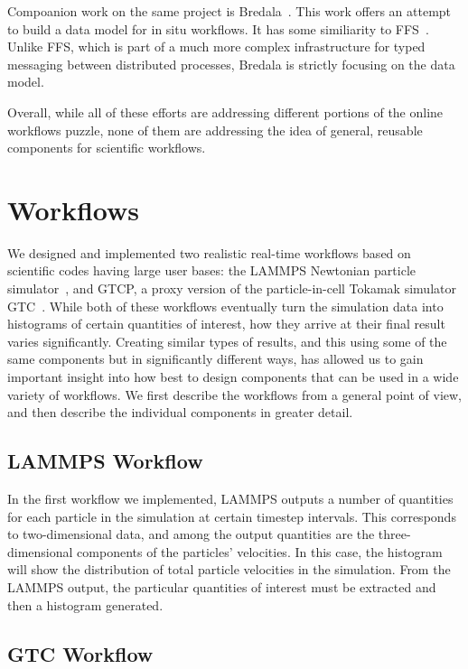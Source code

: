 \documentclass[conference]{IEEEtran}
\begin{document}
Compoanion work on the same project is Bredala~\cite{dreher:2016:bredala}. This
work offers an attempt to build a data model for in situ workflows. It has
some similiarity to FFS~\cite{eisenhauer:2011:ffs}. Unlike FFS, which is part
of a much more complex infrastructure for typed messaging between distributed
processes, Bredala is strictly focusing on the data model.

Overall, while all of these efforts are addressing different portions of the
online workflows puzzle, none of them are addressing the idea of general,
reusable components for scientific workflows.

\section{Workflows}
\label{s:workflow}

We designed and implemented two realistic real-time workflows based on
scientific codes having large user bases: the LAMMPS Newtonian particle
simulator~\cite{plimpton:1997:lammps}, and GTCP, a proxy version of the
particle-in-cell Tokamak simulator GTC~\cite{lin:gtc}. While both of these
workflows eventually turn the simulation data into histograms of certain
quantities of interest, how they arrive at their final result varies
significantly. Creating similar types of results, and this using some of the
same components but in significantly different ways, has allowed us to gain
important insight into how best to design components that can be used in a wide
variety of workflows. We first describe the workflows from a general point of
view, and then describe the individual components in greater detail.

\subsection{LAMMPS Workflow}

In the first workflow we implemented, LAMMPS outputs a number of quantities for
each particle in the simulation at certain timestep intervals.  This
corresponds to two-dimensional data, and among the output quantities are the
three-dimensional components of the particles’ velocities. In this case, the
histogram will show the distribution of total particle velocities in the
simulation.  From the LAMMPS output, the particular quantities of interest must
be extracted and then a histogram generated.

\subsection{GTC Workflow}
\end{document}
